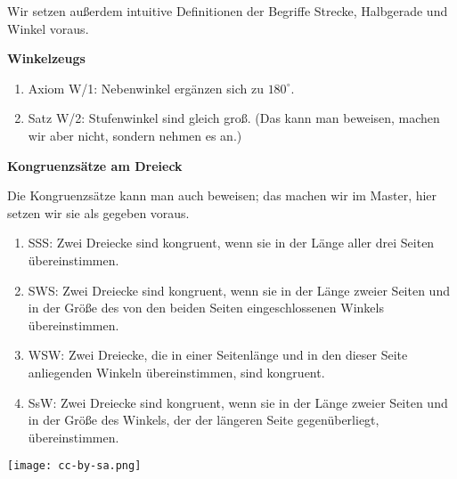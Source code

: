 \documentclass[12pt,a4paper,oneside,ngerman]{article}
\begin{document}
Wir setzen außerdem intuitive Definitionen der Begriffe Strecke, Halbgerade und Winkel voraus.
\newpage

\textbf{Winkelzeugs}
\begin{enumerate}
\item Axiom W/1: Nebenwinkel ergänzen sich zu $180^\circ$.
\item Satz W/2: Stufenwinkel sind gleich groß. (Das kann man beweisen, machen wir aber nicht, sondern nehmen es an.)
\end{enumerate}

\textbf{Kongruenzsätze am Dreieck}

Die Kongruenzsätze kann man auch beweisen; das machen wir im Master, hier setzen wir sie als gegeben voraus.
\begin{enumerate}
\item SSS: Zwei Dreiecke sind kongruent, wenn sie in der Länge aller drei Seiten übereinstimmen. 
\item SWS: Zwei Dreiecke sind kongruent, wenn sie in der Länge zweier Seiten und in der Größe des von den beiden Seiten eingeschlossenen Winkels übereinstimmen. 
\item WSW: Zwei Dreiecke, die in einer Seitenlänge und in den dieser Seite anliegenden Winkeln übereinstimmen, sind kongruent.
\item SsW: Zwei Dreiecke sind kongruent, wenn sie in der Länge zweier Seiten und in der Größe des Winkels, der der längeren Seite gegenüberliegt, übereinstimmen. 
\end{enumerate}


\vspace*{10mm}
\texttt{[image: cc-by-sa.png]}
\end{document}
